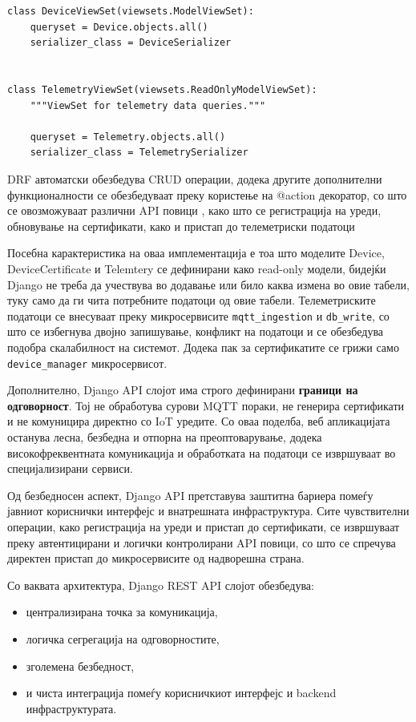 \begin{verbatim}
class DeviceViewSet(viewsets.ModelViewSet):
    queryset = Device.objects.all()
    serializer_class = DeviceSerializer


class TelemetryViewSet(viewsets.ReadOnlyModelViewSet):
    """ViewSet for telemetry data queries."""
    
    queryset = Telemetry.objects.all()
    serializer_class = TelemetrySerializer
\end{verbatim}

DRF автоматски обезбедува CRUD операции, додека другите дополнителни
функционалности се обезбедуваат преку користење на @action декоратор, со
што се овозможуваат различни API повици , како што се регистрација на
уреди, обновување на сертификати, како и пристап до телеметриски
податоци

Посебна карактеристика на оваа имплементација е тоа што моделите Device,
DeviceCertificate и Telemtery се дефинирани како read-only модели,
бидејќи Django не треба да учествува во додавање или било каква измена
во овие табели, туку само да ги чита потребните податоци од овие табели.
Телеметриските податоци се внесуваат преку микросервисите
\texttt{mqtt\_ingestion} и \texttt{db\_write}, со што се избегнува двојно запишување,
конфликт на податоци и се обезбедува подобра скалабилност на системот.
Додека пак за сертификатите се грижи само \texttt{device\_manager} микросервисот.

Дополнително, Django API слојот има строго дефинирани \textbf{граници на
одговорност}. Тој не обработува сурови MQTT пораки, не генерира
сертификати и не комуницира директно со IoT уредите. Со оваа поделба,
веб апликацијата останува лесна, безбедна и отпорна на преоптоварување,
додека високофреквентната комуникација и обработката на податоци се
извршуваат во специјализирани сервиси.

Од безбедносен аспект, Django API претставува заштитна бариера помеѓу
јавниот кориснички интерфејс и внатрешната инфраструктура. Сите
чувствителни операции, како регистрација на уреди и пристап до
сертификати, се извршуваат преку автентицирани и логички контролирани
API повици, со што се спречува директен пристап до микросервисите од
надворешна страна.

Со ваквата архитектура, Django REST API слојот обезбедува:

\begin{itemize}
\item
  централизирана точка за комуникација,
\item
  логичка сегрегација на одговорностите,
\item
  зголемена безбедност,
\item
  и чиста интеграција помеѓу корисничкиот интерфејс и backend
  инфраструктурата.
\end{itemize}

